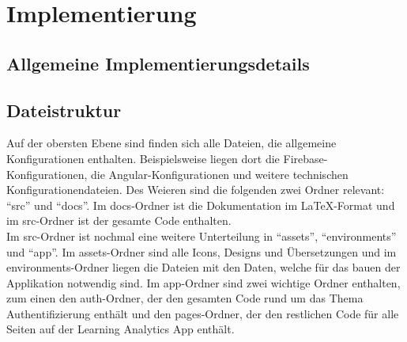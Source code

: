 \chapter{Implementierung}






\section{Allgemeine Implementierungsdetails}

\section{Dateistruktur}

Auf der obersten Ebene sind finden sich alle Dateien, die allgemeine Konfigurationen enthalten. Beispielsweise liegen dort die Firebase-Konfigurationen, die Angular-Konfigurationen und 
weitere technischen Konfigurationendateien. Des Weieren sind die folgenden zwei Ordner relevant: \enquote{src} und \enquote{docs}. Im docs-Ordner ist die Dokumentation im \LaTeX-Format 
und im src-Ordner ist der gesamte Code enthalten. \\
Im src-Ordner ist nochmal eine weitere Unterteilung in \enquote{assets}, \enquote{environments} und \enquote{app}. Im assets-Ordner sind alle Icons, Designs und Übersetzungen und im environments-Ordner 
liegen die Dateien mit den Daten, welche für das bauen der Applikation notwendig sind. Im app-Ordner sind zwei wichtige Ordner enthalten, zum einen den auth-Ordner, der den gesamten Code rund um das 
Thema Authentifizierung enthält und den pages-Ordner, der den restlichen Code für alle Seiten auf der Learning Analytics App enthält. \\


